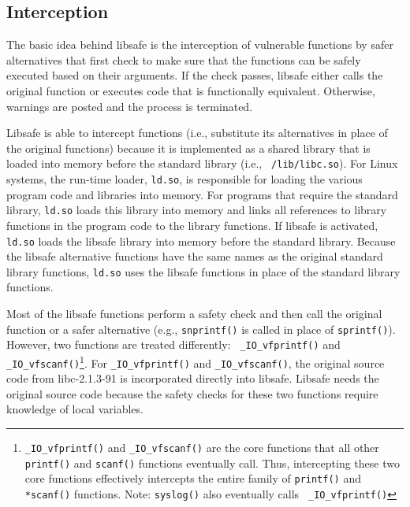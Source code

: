 \documentclass[]{article}
\begin{document}

\subsection{Interception}
\label{subsec:interception}

The basic idea behind libsafe is the interception of vulnerable functions by
safer alternatives that first check to make sure that the functions can be
safely executed based on their arguments.  If the check passes, libsafe either
calls the original function or executes code that is functionally equivalent.
Otherwise, warnings are posted and the process is terminated.

Libsafe is able to intercept functions (i.e., substitute its alternatives in
place of the original functions) because it is implemented as a shared library
that is loaded into memory before the standard library (i.e., {\tt
/lib/libc.so}).  For Linux systems, the run-time loader, {\tt ld.so}, is
responsible for loading the various program code and libraries into memory.
For programs that require the standard library, {\tt ld.so} loads this library
into memory and links all references to library functions in the program code
to the library functions.  If libsafe is activated, {\tt ld.so} loads the
libsafe library into memory before the standard library.  Because the libsafe
alternative functions have the same names as the original standard library
functions, {\tt ld.so} uses the libsafe functions in place of the standard
library functions.

Most of the libsafe functions perform a safety check and then call the original
function or a safer alternative (e.g., {\tt snprintf()} is called in place of
{\tt sprintf()}).  However, two functions are treated differently:  {\tt
\_IO\_vfprintf()} and {\tt \_IO\_vfscanf()}\footnote{{\tt \_IO\_vfprintf()} and
{\tt \_IO\_vfscanf()} are the core functions that all other {\tt *printf()} and
{\tt *scanf()} functions eventually call.  Thus, intercepting these two core
functions effectively intercepts the entire family of {\tt *printf()} and {\tt
*scanf()} functions.  Note: {\tt syslog()} also eventually calls {\tt
\_IO\_vfprintf()}}.  For {\tt \_IO\_vfprintf()} and {\tt \_IO\_vfscanf()}, the
original source code from libc-2.1.3-91 is incorporated directly into libsafe.
Libsafe needs the original source code because the safety checks for these two
functions require knowledge of local variables.
\end{document}
